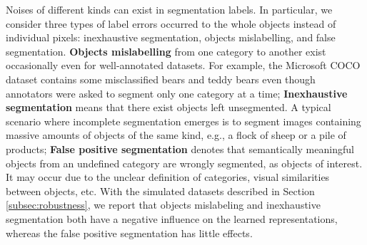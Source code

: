 Noises of different kinds can exist in segmentation labels. %
In particular, we consider three types of label errors occurred to the whole objects instead of individual pixels: inexhaustive segmentation, objects mislabelling, and false segmentation.
\textbf{Objects mislabelling} from one category to another exist occasionally even for well-annotated datasets.
For example, the Microsoft COCO dataset \cite{lin2014microsoft} contains some misclassified bears and teddy bears even though annotators were asked to segment only one category at a time;
\textbf{Inexhaustive segmentation} means that there exist objects left unsegmented.
A typical scenario where incomplete segmentation emerges is to segment images containing massive amounts of objects of the same kind, e.g., a flock of sheep or a pile of products;
\textbf{False positive segmentation} denotes that semantically meaningful objects from an undefined category are wrongly segmented, as objects of interest.
It may occur due to the unclear definition of categories, visual similarities between objects, etc.
With the simulated datasets described in Section \ref{subsec:robustness}, we report that objects mislabeling and inexhaustive segmentation both have a negative influence on the learned representations, whereas the false positive segmentation has little effects.





